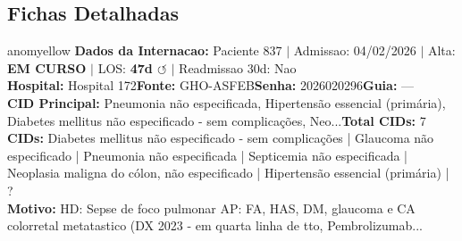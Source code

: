 \documentclass[a4paper,10pt]{article}
\begin{document}
\subsection{Fichas Detalhadas}
\begin{anomalycard}[Internacao 696 | GHO-ASFEB | MODERADO (z=2.66)]{anomyellow}
\textbf{Dados da Internacao:} Paciente 837 $\mid$ Admissao: 04/02/2026 $\mid$ Alta: \textcolor{anomorange}{\textbf{EM CURSO}} $\mid$ LOS: \textbf{47d \textcolor{anomorange}{$\circlearrowleft$}} $\mid$ Readmissao 30d: Nao\\
\textbf{Hospital:} Hospital 172\quad\textbf{Fonte:} GHO-ASFEB\quad\textbf{Senha:} 2026020296\quad\textbf{Guia:} ---\\
\textbf{CID Principal:} {\small Pneumonia não especificada, Hipertensão essencial (primária), Diabetes mellitus não especificado - sem complicações, Neo...}\quad\textbf{Total CIDs:} 7\\

\textbf{CIDs:} {\scriptsize Diabetes mellitus não especificado - sem complicações | Glaucoma não especificado | Pneumonia não especificada | Septicemia não especificada | Neoplasia maligna do cólon, não especificado | Hipertensão essencial (primária) | ?}\\

\textbf{Motivo:} {\scriptsize HD: Sepse de foco pulmonar AP: FA, HAS, DM, glaucoma e CA colorretal metatastico (DX 2023 - em quarta linha de tto, Pembrolizumab...}\\


\end{anomalycard}
\end{document}
